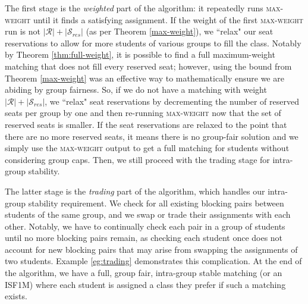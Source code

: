 The first stage is the \textit{weighted} part of the algorithm: it repeatedly
runs \textsc{max-weight} until it finds a satisfying assignment. If the weight of
the first \textsc{max-weight} run is not $|\mathcal{R}| + |\mathcal{S}_{res}|$ (as per Theorem
\ref{max-weight}), we ``relax" our seat reservations to allow for more students
of various groups to fill the class. Notably by Theorem \ref{thm:full-weight},
it is possible to find a full maximum-weight matching that does
not fill every reserved seat; however, using the bound from Theorem
\ref{max-weight} was an effective way to mathematically ensure we are abiding by
group fairness. So, if we do not have a matching with weight  $|\mathcal{R}| +
|\mathcal{S}_{res}|$, we ``relax" seat reservations by decrementing the number of
reserved seats per group by one and then re-running \textsc{max-weight} now that
the set of reserved seats is smaller. If the seat reservations are relaxed to
the point that there are no more reserved seats, it means there is no group-fair
solution and we simply use the \textsc{max-weight} output to get a full matching for
students without considering group caps. Then, we still proceed with the trading
stage for intra-group stability.

The latter stage is the \textit{trading} part of the algorithm, which handles
our intra-group stability requirement. We check for all existing blocking pairs
between students of the same group, and we swap or trade their assignments with
each other. Notably, we have to continually check each pair in a group of
students until no more blocking pairs remain, as checking each student once does
not account for new blocking pairs that may arise from swapping the assignments
of two students. Example \ref{eg:trading} demonstrates this complication. At the
end of the algorithm, we have a full, group fair, intra-group
stable matching (or an ISF1M) where each student is assigned a class they prefer
if such a matching exists.


